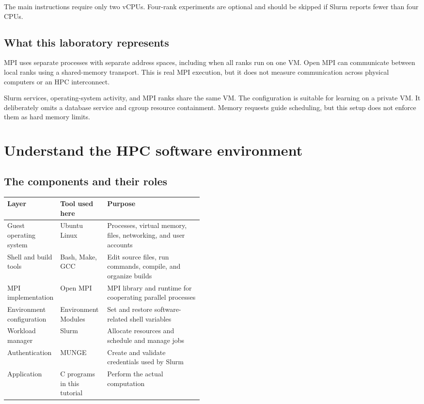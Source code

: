 \documentclass[11pt,a4paper]{article}
\begin{document}
The main instructions require only two vCPUs. Four-rank experiments are
optional and should be skipped if Slurm reports fewer than four CPUs.

\subsection{What this laboratory represents}
MPI uses separate processes with separate address spaces, including when all
ranks run on one VM. Open MPI can communicate between local ranks using a
shared-memory transport. This is real MPI execution, but it does not measure
communication across physical computers or an HPC interconnect.

Slurm services, operating-system activity, and MPI ranks share the same VM.
The configuration is suitable for learning on a private VM. It deliberately
omits a database service and cgroup resource containment. Memory requests
guide scheduling, but this setup does not enforce them as hard memory limits.

\section{Understand the HPC software environment}
\subsection{The components and their roles}
\begin{tabularx}{\linewidth}{@{}P{0.23\linewidth}P{0.24\linewidth}Y@{}}
\toprule
Layer & Tool used here & Purpose \\
\midrule
Guest operating system & Ubuntu Linux & Processes, virtual memory, files, networking, and user accounts \\
Shell and build tools & Bash, Make, GCC & Edit source files, run commands, compile, and organize builds \\
MPI implementation & Open MPI & MPI library and runtime for cooperating parallel processes \\
Environment configuration & Environment Modules & Set and restore software-related shell variables \\
Workload manager & Slurm & Allocate resources and schedule and manage jobs \\
Authentication & MUNGE & Create and validate credentials used by Slurm \\
Application & C programs in this tutorial & Perform the actual computation \\
\bottomrule
\end{tabularx}
\end{document}
